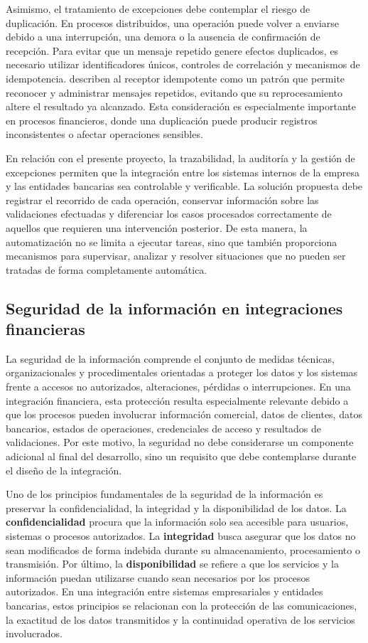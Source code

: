 Asimismo, el tratamiento de excepciones debe contemplar el riesgo de duplicación. En procesos distribuidos, una operación puede volver a enviarse debido a una interrupción, una demora o la ausencia de confirmación de recepción. Para evitar que un mensaje repetido genere efectos duplicados, es necesario utilizar identificadores únicos, controles de correlación y mecanismos de idempotencia. \citet{hohpe2003} describen al receptor idempotente como un patrón que permite reconocer y administrar mensajes repetidos, evitando que su reprocesamiento altere el resultado ya alcanzado. Esta consideración es especialmente importante en procesos financieros, donde una duplicación puede producir registros inconsistentes o afectar operaciones sensibles.

En relación con el presente proyecto, la trazabilidad, la auditoría y la gestión de excepciones permiten que la integración entre los sistemas internos de la empresa y las entidades bancarias sea controlable y verificable. La solución propuesta debe registrar el recorrido de cada operación, conservar información sobre las validaciones efectuadas y diferenciar los casos procesados correctamente de aquellos que requieren una intervención posterior. De esta manera, la automatización no se limita a ejecutar tareas, sino que también proporciona mecanismos para supervisar, analizar y resolver situaciones que no pueden ser tratadas de forma completamente automática.

\subsection{Seguridad de la información en integraciones financieras}

La seguridad de la información comprende el conjunto de medidas técnicas, organizacionales y procedimentales orientadas a proteger los datos y los sistemas frente a accesos no autorizados, alteraciones, pérdidas o interrupciones. En una integración financiera, esta protección resulta especialmente relevante debido a que los procesos pueden involucrar información comercial, datos de clientes, datos bancarios, estados de operaciones, credenciales de acceso y resultados de validaciones. Por este motivo, la seguridad no debe considerarse un componente adicional al final del desarrollo, sino un requisito que debe contemplarse durante el diseño de la integración.

Uno de los principios fundamentales de la seguridad de la información es preservar la confidencialidad, la integridad y la disponibilidad de los datos. La \textbf{confidencialidad} procura que la información solo sea accesible para usuarios, sistemas o procesos autorizados. La \textbf{integridad} busca asegurar que los datos no sean modificados de forma indebida durante su almacenamiento, procesamiento o transmisión. Por último, la \textbf{disponibilidad} se refiere a que los servicios y la información puedan utilizarse cuando sean necesarios por los procesos autorizados. En una integración entre sistemas empresariales y entidades bancarias, estos principios se relacionan con la protección de las comunicaciones, la exactitud de los datos transmitidos y la continuidad operativa de los servicios involucrados.


